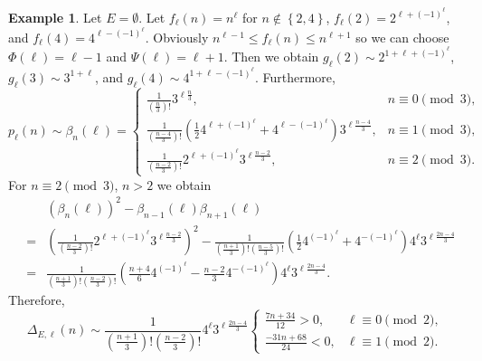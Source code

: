 \documentclass[12pt]{amsart}
\theoremstyle{definition}
\newtheorem{example}{Example}
\theoremstyle{remark}
\numberwithin{theorem}{section} \numberwithin{equation}{section}
\begin{document}
\begin{example}
Let $E=\emptyset $. Let $f_{\ell }\left( n\right) =n^{\ell }$ for
$n\notin \left\{ 2,4\right\} $,
$f_{\ell }\left( 2\right) =2^{\ell +\left( -1\right) ^{\ell }}$, and
$f_{\ell }\left( 4\right) =4^{\ell -\left( -1\right) ^{\ell }}$.
Obviously $n^{\ell -1}\leq f_{\ell }\left( n\right) \leq n^{\ell +1}$
so we can choose $\Phi \left( \ell \right) =\ell -1$ and
$\Psi \left( \ell \right) =\ell +1$. Then we obtain
$g_{\ell }\left( 2\right)
\sim 2^{1+\ell +\left( -1\right) ^{\ell }}$,
$g_{\ell }\left( 3\right)
\sim 3^{1+\ell }$, and
$g_{\ell }\left( 4\right)
\sim 4^{1+\ell -\left( -1\right) ^{\ell }}$.
Furthermore,
\[
p_{\ell }\left( n\right) \sim \beta _{n}\left( \ell \right) =\left\{
\begin{array}{ll}
\frac{1}{\left( \frac{n}{3}\right) !}3^{\ell \frac{n}{3}},&n\equiv 0\pmod{3},\\
\frac{1}{\left( \frac{n-4}{3}\right) !}
\left( \frac{1}{2}4^{\ell +\left( -1\right) ^{\ell }}
+4^{\ell -\left( -1\right) ^{\ell }}\right) 3^{\ell \frac{n-4}{3}},
&n\equiv 1\pmod{3},\\
\frac{1}{\left( \frac{n-2}{3}\right) !}
2^{\ell +\left( -1\right) ^{\ell }}3^{\ell \frac{n-2}{3}},&n\equiv 2\pmod{3}.
\end{array}
\right.
\]
For $n\equiv 2\pmod{3}$, $n>2$ we obtain
\begin{eqnarray*}
&&\left( \beta _{n}\left( \ell \right) \right) ^{2}
-\beta _{n-1}\left( \ell \right) \beta _{n+1}\left( \ell \right) \\
&=&\left( \frac{1}{\left( \frac{n-2}{3}\right) !}
2^{\ell +\left( -1\right) ^{\ell }}3^{\ell \frac{n-2}{3}}\right) ^{2}
-\frac{1}{\left( \frac{n+1}{3}\right) !\left( \frac{n-5}{3}\right) !}\left(
\frac{1}{2}4^{\left( -1\right) ^{\ell }}+4^{-\left( -1\right) ^{\ell }}
\right) 4^{\ell }3^{\ell \frac{2n-4}{3}}\\
&=&\frac{1}{\left( \frac{n+1}{3}\right) !\left( \frac{n-2}{3}\right) !}
\left( \frac{n+4}{6}4^{\left( -1\right) ^{\ell }}
-\frac{n-2}{3}4^{-\left( -1\right) ^{\ell }}\right)
4^{\ell }3^{\ell \frac{2n-4}{3}}.
\end{eqnarray*}
Therefore,
\[
\Delta _{E,\ell }\left( n\right)
\sim \frac{1}{\left( \frac{n+1}{3}\right) !\left( \frac{n-2}{3}\right) !}
4^{\ell }3^{\ell \frac{2n-4}{3}}\left\{
\begin{array}{ll}
\frac{7n+34}{12}>0, & \ell \equiv 0\pmod{2}, \\
\frac{-31n+68}{24}<0, & \ell \equiv 1\pmod{2}. 
\end{array}
\right.
\]
\end{example}
\end{document}
